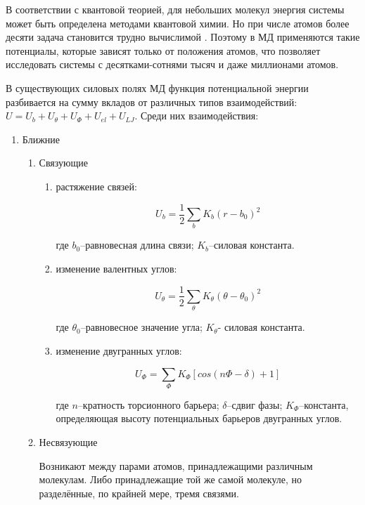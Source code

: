В соответствии с квантовой теорией, для небольших молекул энергия системы может быть определена методами квантовой химии. Но при числе атомов более десяти задача становится трудно вычислимой \cite{Shaitan2006}. Поэтому в МД применяются такие потенциалы, которые зависят только от положения атомов, что позволяет исследовать системы с десятками-сотнями тысяч и даже миллионами атомов.

В существующих силовых полях МД функция потенциальной энергии разбивается на сумму вкладов от различных типов взаимодействий: $U = U_b+U_\theta+U_\Phi+U_{el}+U_{LJ}$. Среди них взаимодействия:

\begin{enumerate}

\item Ближние

	\begin{enumerate}

	\item Связующие

		\begin{enumerate}

		\item растяжение связей:
		
		\[
		U_{b} = \frac{1}{2} \sum_b{K_{b}(r-b_{0})^{2}}
		\]
		
		где $b_0$--равновесная длина связи; $K_b$--силовая константа.
		
		\item изменение валентных углов:
		
		\[
		U_{\theta} = \frac{1}{2} \sum_\theta{K_{\theta}(\theta-\theta_{0})^{2}}
		\]
		
		где $\theta_0$--равновесное  значение угла; $K_{\theta}$- силовая константа.

		\item изменение двугранных углов:

		\[
		U_{\Phi} = \sum_{\Phi}{K_{\Phi}[cos(n\Phi-\delta)+1]}
		\]
		
		где $n$--кратность торсионного барьера; $\delta$--сдвиг фазы; $K_{\Phi}$--константа, определяющая высоту потенциальных барьеров двугранных углов.

		\end{enumerate}

	\item Несвязующие 
	
	Возникают между парами атомов, принадлежащими различным молекулам. Либо принадлежащие той же самой молекуле, но разделённые, по крайней мере, тремя связями.


\end{enumerate}
\end{enumerate}
